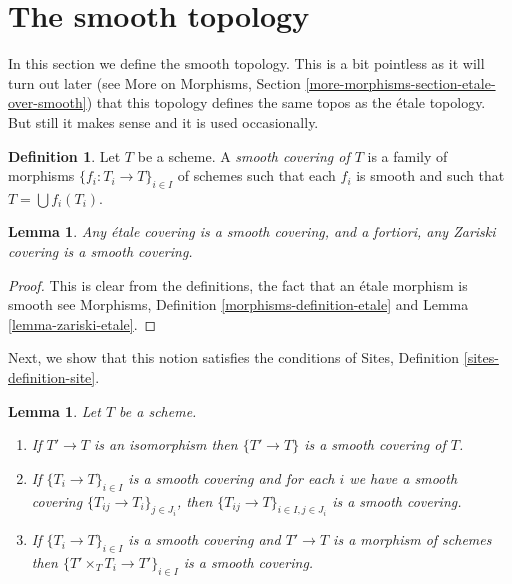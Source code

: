 \documentclass{stacks-project}
\theoremstyle{plain}
\newtheorem{lemma}[subsection]{Lemma}
\theoremstyle{definition}
\newtheorem{definition}[subsection]{Definition}
\theoremstyle{remark}
\numberwithin{equation}{subsection}
\begin{document}
\section{The smooth topology}
\label{section-smooth}

\noindent
In this section we define the smooth topology.
This is a bit pointless as it will turn out later (see
More on Morphisms, Section \ref{more-morphisms-section-etale-over-smooth})
that this topology defines the same topos as the
\'etale topology. But still it makes sense and it is used
occasionally.

\begin{definition}
\label{definition-smooth-covering}
Let $T$ be a scheme. A {\it smooth covering of $T$} is a family
of morphisms $\{f_i : T_i \to T\}_{i \in I}$ of schemes
such that each $f_i$ is smooth and such
that $T = \bigcup f_i(T_i)$.
\end{definition}

\begin{lemma}
\label{lemma-zariski-etale-smooth}
Any \'etale covering is a smooth covering, and a fortiori,
any Zariski covering is a smooth covering.
\end{lemma}

\begin{proof}
This is clear from the definitions, the fact that an \'etale morphism is
smooth see
Morphisms, Definition \ref{morphisms-definition-etale}
and Lemma \ref{lemma-zariski-etale}.
\end{proof}

\noindent
Next, we show that this notion satisfies the conditions of
Sites, Definition \ref{sites-definition-site}.

\begin{lemma}
\label{lemma-smooth}
Let $T$ be a scheme.
\begin{enumerate}
\item If $T' \to T$ is an isomorphism then $\{T' \to T\}$
is a smooth covering of $T$.
\item If $\{T_i \to T\}_{i\in I}$ is a smooth covering and for each
$i$ we have a smooth covering $\{T_{ij} \to T_i\}_{j\in J_i}$, then
$\{T_{ij} \to T\}_{i \in I, j\in J_i}$ is a smooth covering.
\item If $\{T_i \to T\}_{i\in I}$ is a smooth covering
and $T' \to T$ is a morphism of schemes then
$\{T' \times_T T_i \to T'\}_{i\in I}$ is a smooth covering.
\end{enumerate}
\end{lemma}
\end{document}

